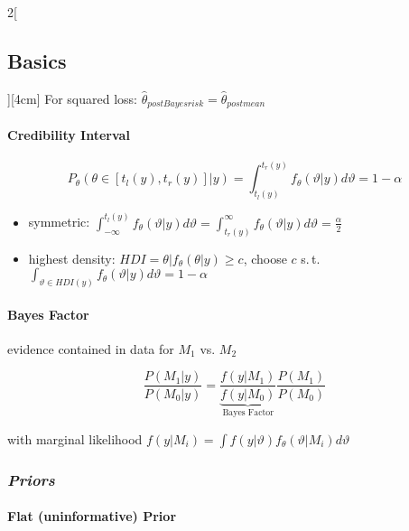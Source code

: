 \documentclass[8pt]{extarticle}
\begin{document}
\begin{multicols}{2}[\subsection{Basics}][4cm]
\noindent For squared loss: $\hat{\theta}_{postBayesrisk} = \hat{\theta}_{postmean}$


\paragraph{Credibility Interval}

$$P_\theta(\theta\in \left[t_l(y),t_r(y)\right]|y) = \int_{t_l(y)}^{t_r(y)} f_\theta(\vartheta|y)d\vartheta = 1- \alpha$$

\begin{itemize}
\item symmetric: $\int_{-\infty}^{t_l(y)} f_\theta(\vartheta|y)d\vartheta = \int_{t_r(y)}^{\infty} f_\theta(\vartheta|y)d\vartheta = \frac{\alpha}{2}$
\item highest density: $HDI = {\theta|f_\theta(\theta|y)\geq c}$, choose $c$ s.\,t.\  $\int_{\vartheta \in HDI(y)} f_\theta(\vartheta|y)d\vartheta = 1-\alpha$
\end{itemize}




\paragraph{Bayes Factor} evidence contained in data for $M_1$ vs. $M_2$

$$\frac{P(M_1|y)}{P(M_0|y)} =  \underbrace{\frac{f(y|M_1)}{f(y|M_0)}}_{\text{Bayes Factor}} \frac{P(M_1)}{P(M_0)}$$

with marginal likelihood $f(y|M_i) = \int f(y|\vartheta)f_\theta(\vartheta|M_i)d\vartheta$


\subsubsection*{\textit{Priors}}

\paragraph{Flat (uninformative) Prior} \ \\


\end{multicols}
\end{document}
